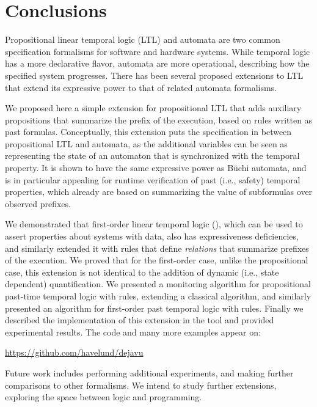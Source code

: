 
\vspace{-1.7cm} \quad 


\section{Conclusions}

Propositional linear temporal logic (LTL) and automata are two common specification formalisms for software and hardware systems. While temporal logic has a more declarative
flavor, automata are more operational, describing how the specified system
progresses. There has been several proposed extensions to LTL that extend
its expressive power to that of related automata formalisms.

We proposed here
a simple extension for propositional LTL that adds auxiliary propositions that summarize the prefix of the execution, based on rules written as past formulas. Conceptually, this extension puts the specification in between propositional LTL and automata, as the additional
variables can be seen as representing the state of an automaton
that is synchronized with the temporal property. It is shown to have
the same expressive power as B\"{u}chi automata, and is in particular
appealing for runtime verification of past (i.e., safety) temporal properties,
which already are based on summarizing the value of subformulas over
observed prefixes.

%
We demonstrated that first-order linear temporal logic (\FLTL{}), which
can be used to assert properties about systems with data, also has expressiveness deficiencies, and similarly
extended it with rules
that define {\em relations} that summarize prefixes of the execution.
We proved that for the first-order case, unlike the propositional case,
this extension is not identical to the addition of dynamic (i.e., state dependent) quantification.
%
We presented a monitoring
algorithm for propositional past-time temporal logic with rules, extending a classical algorithm, and similarly presented an algorithm for 
first-order past temporal logic with rules.
Finally we described the implementation of this extension in the \dejavu{} tool and provided experimental results. The
code and many more examples appear on:
\begin{center}
\url{https://github.com/havelund/dejavu}
\end{center}

%
Future work includes performing additional experiments, and making further comparisons to other formalisms. We intend to study further extensions, exploring the space between logic and programming.